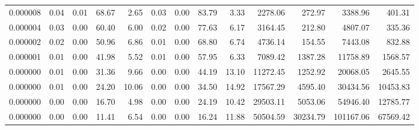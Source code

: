 \begin{tabular}{lrrrrrrrrrrrr}
0.000008 & 0.04 & 0.01 & 68.67 & 2.65 & 0.03 & 0.00 & 83.79 & 3.33 & 2278.06 & 272.97 & 3388.96 & 401.31 \\
0.000004 & 0.03 & 0.00 & 60.40 & 6.00 & 0.02 & 0.00 & 77.63 & 6.17 & 3164.45 & 212.80 & 4807.07 & 335.36 \\
0.000002 & 0.02 & 0.00 & 50.96 & 6.86 & 0.01 & 0.00 & 68.80 & 6.74 & 4736.14 & 154.55 & 7443.08 & 832.88 \\
0.000001 & 0.01 & 0.00 & 41.98 & 5.52 & 0.01 & 0.00 & 57.95 & 6.33 & 7089.42 & 1387.28 & 11758.89 & 1568.57 \\
0.000000 & 0.01 & 0.00 & 31.36 & 9.66 & 0.00 & 0.00 & 44.19 & 13.10 & 11272.45 & 1252.92 & 20068.05 & 2645.55 \\
0.000000 & 0.01 & 0.00 & 24.20 & 10.06 & 0.00 & 0.00 & 34.50 & 14.92 & 17567.29 & 4595.40 & 30434.56 & 10453.83 \\
0.000000 & 0.00 & 0.00 & 16.70 & 4.98 & 0.00 & 0.00 & 24.19 & 10.42 & 29503.11 & 5053.06 & 54946.40 & 12785.77 \\
0.000000 & 0.00 & 0.00 & 11.41 & 6.54 & 0.00 & 0.00 & 16.24 & 11.88 & 50504.59 & 30234.79 & 101167.06 & 67569.42 \\
\bottomrule
\end{tabular}
